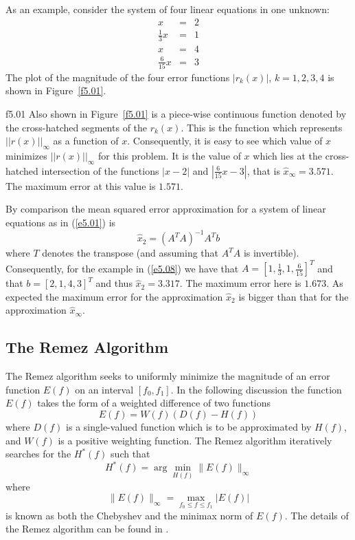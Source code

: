 	As an example, consider the system of four linear
equations in one unknown:
%
\begin{eqnarray}
x&=&2\nonumber\\
\frac{1}{3}x&=&1\nonumber\\
x&=&4\nonumber\\
\frac{6}{15}x&=&3
\label{e5.08}
\end{eqnarray}
%
The plot of the magnitude of the four error functions
$|r_k(x)|$, $k=1,2,3,4$ is shown in Figure~\ref{f5.01}.
%

{f5.01}
%
Also shown in Figure~\ref{f5.01} is a piece-wise continuous
function denoted by the cross-hatched segments of the $r_k(x)$.  This
is the function which represents $||r(x)||_{\infty}$ as a function
of $x$.  Consequently, it is easy to see which value
of $x$ minimizes $||r(x)||_{\infty}$ for this problem.  It is
the value of $x$ which lies at the cross-hatched intersection of the
functions $|x-2|$ and $|\frac{6}{15}x-3|$,  that is 
$\hat{x}_{\infty}=3.571$.  The maximum error at this value is 
$1.571$.

	By comparison the mean squared error
approximation for a system of linear equations as in 
(\ref{e5.01}) is
%
\begin{equation}
\hat{x}_2=(A^TA)^{-1}A^Tb
\label{e5.09}
\end{equation}
%
where $T$ denotes the transpose  (and assuming that $A^TA$ is
invertible).  Consequently, for the example in (\ref{e5.08})
we have that $A=[1, \frac{1}{3}, 1, \frac{6}{15}]^T$ and
that $b=[2, 1, 4, 3]^T$ and thus $\hat{x}_2=3.317$.  The maximum 
error here is $1.673$.  As expected the maximum error for
the approximation $\hat{x}_2$ is bigger than that for the
approximation $\hat{x}_{\infty}$.

\subsection{The Remez Algorithm}


	The Remez algorithm seeks to uniformly minimize
the magnitude of an error function $E(f)$ on an interval $[f_0,f_1]$.
In the following discussion
the function $E(f)$ takes the form of a weighted difference of two functions
%
\begin{equation}
E(f)=W(f)(D(f)-H(f))
\label{e5.1}
\end{equation}
%
where $D(f)$ is a single-valued function
which is to be approximated by $H(f)$, and $W(f)$ is a 
positive weighting function.  The Remez algorithm iteratively searches 
for the $H^*(f)$ such that
%
\begin{equation}
H^*(f)=\arg \min_{H(f)}\|E(f)\|_{\infty}
\label{e5.2}
\end{equation}
%
where
%
\begin{equation}
\|E(f)\|_{\infty}=\max_{f_0\le f\le f_1}|E(f)|
\label{e5.3}
\end{equation}
%
is known as both the Chebyshev and the minimax norm of $E(f)$.
The details of the Remez algorithm can be found in \cite{cheney}.

